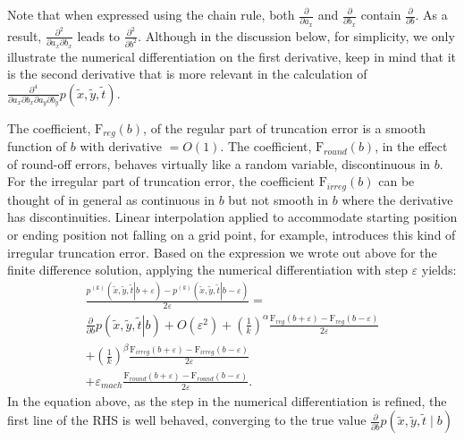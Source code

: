 Note that when expressed using the chain rule, both
$\displaystyle \frac{\partial}{\partial a_x}$ and
$\displaystyle \frac{\partial}{\partial b_x}$ contain
$\displaystyle \frac{\partial}{\partial b}$. As a result,
$\displaystyle \frac{\partial^2 }{\partial a_x \partial b_x} $ leads
to $\displaystyle \frac{\partial^2 }{\partial b^2} $. Although in the
discussion below, for simplicity, we only illustrate the numerical
differentiation on the first derivative, keep in mind that it is the
second derivative that is more relevant in the calculation of
$\displaystyle \frac{\partial^4}{\partial a_x \partial b_x \partial
  a_y \partial b_y} p(\tilde{x},\tilde{y},\tilde{t}) $.

The coefficient, $\mbox{F}_{reg}(b) $, of the regular part of
truncation error is a smooth function of $b$ with derivative $= O(1)$.
The coefficient, $\mbox{F}_{round}(b) $, in the effect of round-off
errors, behaves virtually like a random variable, discontinuous in
$b$.  For the irregular part of truncation error, the coefficient
$\mbox{F}_{irreg}(b) $ can be thought of in general as continuous in
$b$ but not smooth in $b$ where the derivative has
discontinuities. Linear interpolation applied to accommodate starting
position or ending position not falling on a grid point, for example,
introduces this kind of irregular truncation error. Based on the
expression we wrote out above for the finite difference solution,
applying the numerical differentiation with step $\varepsilon$ yields:
\begin{multline}
   \frac{p^{(k)}(\left. \tilde{x},\tilde{y},\tilde{t} \right| b+\varepsilon)-p^{(k)}(\left. \tilde{x},\tilde{y},\tilde{t} \right| b -\varepsilon)}{2 \varepsilon} = \nonumber \\
   \frac{\partial }{\partial b} p(\left. \tilde{x},\tilde{y},\tilde{t} \right| b) + O(\varepsilon^2)
      + \left(\frac{1}{k}\right)^{\alpha} \frac{\mbox{F}_{reg}(b+\varepsilon)-\mbox{F}_{reg}(b-\varepsilon)}{2 \varepsilon}  \nonumber \\
      + \left(\frac{1}{k}\right)^{\beta} \frac{\mbox{F}_{irreg}(b+\varepsilon)-\mbox{F}_{irreg}(b-\varepsilon)}{2 \varepsilon} \\
      + \varepsilon_{mach} \frac{\mbox{F}_{round}(b+\varepsilon)-\mbox{F}_{round}(b-\varepsilon)}{2 \varepsilon}.  \nonumber
\end{multline}
In the equation above, as the step in the numerical differentiation is
refined, the first line of the RHS is well behaved, converging to the
true value $\frac{\partial }{\partial b} p( \tilde{x},\tilde{y},\tilde{t} \mid b)$
